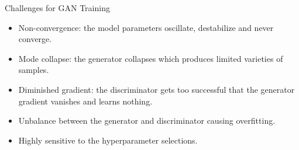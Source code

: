 \documentclass[11pt,compress,t,notes=noshow, xcolor=table]{beamer}
\begin{document}
\begin{frame} {Challenges for GAN Training}

  \begin{itemize}
    \item Non-convergence: the model parameters oscillate, destabilize and never converge.
    \item Mode collapse: the generator collapses which produces limited varieties of samples.
     \item Diminished gradient: the discriminator gets too successful that the generator gradient vanishes and learns nothing.
     \item Unbalance between the generator and discriminator causing overfitting.
     \item Highly sensitive to the hyperparameter selections.
  \end{itemize}
\end{frame}


\end{document}
